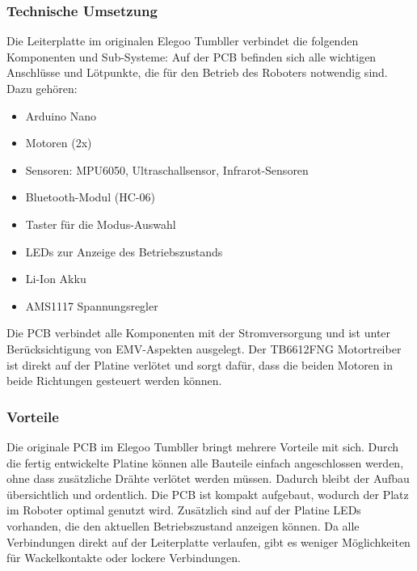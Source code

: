 \subsubsection{Technische Umsetzung}
Die Leiterplatte im originalen Elegoo Tumbller verbindet die folgenden Komponenten und Sub-Systeme:
%
Auf der PCB befinden sich alle wichtigen Anschlüsse und Lötpunkte,
die für den Betrieb des Roboters notwendig sind. Dazu gehören:
\begin{itemize}
    \item Arduino Nano
    \item Motoren (2x)
    \item Sensoren: MPU6050, Ultraschallsensor, Infrarot-Sensoren
    \item Bluetooth-Modul (HC-06)
    \item Taster für die Modus-Auswahl
    \item LEDs zur Anzeige des Betriebszustands
    \item Li-Ion Akku
    \item AMS1117 Spannungsregler
\end{itemize}
Die PCB verbindet alle Komponenten mit der Stromversorgung und ist unter Berücksichtigung von EMV-Aspekten ausgelegt.
Der TB6612FNG Motortreiber ist direkt auf der Platine verlötet und sorgt dafür,
dass die beiden Motoren in beide Richtungen gesteuert werden können.
%
\subsubsection{Vorteile}
Die originale PCB im Elegoo Tumbller bringt mehrere Vorteile mit sich.
%
Durch die fertig entwickelte Platine können alle Bauteile einfach angeschlossen werden,
ohne dass zusätzliche Drähte verlötet werden müssen.
%
Dadurch bleibt der Aufbau übersichtlich und ordentlich.
%
Die PCB ist kompakt aufgebaut,
wodurch der Platz im Roboter optimal genutzt wird.
%
Zusätzlich sind auf der Platine LEDs vorhanden,
die den aktuellen Betriebszustand anzeigen können.
%
Da alle Verbindungen direkt auf der Leiterplatte verlaufen,
gibt es weniger Möglichkeiten für Wackelkontakte oder lockere Verbindungen.

